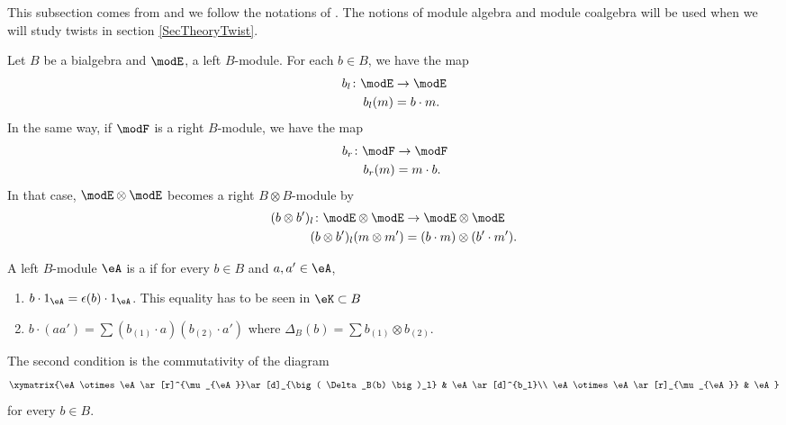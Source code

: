 This subsection comes from \cite{GiaquintoZhangTwist} and we follow the notations of \cite{QuantifKhalerian}. The notions of module algebra and module coalgebra will be used when we will study twists in section \ref{SecTheoryTwist}.

Let $B$ be a bialgebra and $\modE$, a left $B$-module. For each $b\in B$, we have the map
\begin{equation}
	\begin{aligned}
		b_l\colon \modE&\to \modE \\
		b_l(m)&=b\cdot m.
	\end{aligned}
\end{equation}
In the same way, if $\modF$ is a right $B$-module, we have the map
\begin{equation}
	\begin{aligned}
		b_r\colon \modF&\to \modF \\
		b_r(m)&=m\cdot b.
	\end{aligned}
\end{equation}
In that case, $\modE\otimes\modE$ becomes a right $B\otimes B$-module by
\begin{equation}
	\begin{aligned}
		(b\otimes b')_l\colon \modE\otimes\modE&\to \modE\otimes\modE \\
		(b\otimes b')_l(m\otimes m')&=(b\cdot m)\otimes(b'\cdot m').
	\end{aligned}
\end{equation}

\begin{definition}		\label{DefBModuleAlgebra}
	A left $B$-module $\eA$ is a  if for every $b\in B$ and $a,a'\in\eA$,
	\begin{enumerate}
	
		\item
			$b\cdot 1_{\eA}=\epsilon(b)\cdot 1_{\eA}$. This equality has to be seen in $\eK\subset B$
		\item
			$b\cdot(aa')=\sum(b_{(1)}\cdot a)(b_{(2)}\cdot a')$ where $\Delta_B(b)=\sum b_{(1)}\otimes b_{(2)}$.
	
	\end{enumerate}
	The second condition is the commutativity of the diagram
	\begin{equation}	\label{EqDiagModAlg}
		\xymatrix{%
		\eA\otimes\eA \ar[r]^{\mu_{\eA}}\ar[d]_{\big( \Delta_B(b) \big)_l}	&	\eA\ar[d]^{b_l}\\
		\eA\otimes\eA \ar[r]_{\mu_{\eA}}	&	\eA
		   }
	\end{equation}
	for every $b\in B$.
\end{definition}

